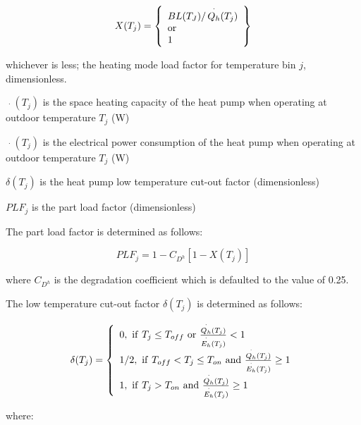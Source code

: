 \begin{equation}
X({T_j}) = \left\{ 
    \begin{array}{l}
      BL({T_J})/\mathop {{Q_h}}\limits^ \cdot  ({T_j}) \\
      {\rm{or}} \\
      1
    \end{array}
  \right\}
\end{equation}

whichever is less; the heating mode load factor for temperature bin \(j\), dimensionless.

\(\mathop {{Q_h}}\limits^ \cdot ({T_j})\) is the space heating capacity of the heat pump when operating at outdoor temperature \({T_j}\) (W)

\(\mathop {{E_h}}\limits^ \cdot ({T_j})\) is the electrical power consumption of the heat pump when operating at outdoor temperature \({T_j}\) (W)

\(\delta ({T_j})\) is the heat pump low temperature cut-out factor (dimensionless)

\(PL{F_j}\) is the part load factor (dimensionless)

The part load factor is determined as follows:

\begin{equation}
PL{F_j} = 1 - {C_{{D^h}}}[1 - X({T_j})]
\end{equation}

where \({C_{{D^h}}}\) is the degradation coefficient which is defaulted to the value of 0.25.

The low temperature cut-out factor \(\delta ({T_j})\) is determined as follows:

\begin{equation}
\delta ({T_j}) = \left\{ 
    \begin{array}{l}
      {\rm{0,~if~}}{T_j} \le {T_{off}}{\rm{~or~}}\frac{{\mathop {{Q_h}}\limits^ \cdot  ({T_j})}}{{\mathop {{E_h}}\limits^ \cdot  ({T_j})}} < 1 \\
      {\rm{1/2,~if~}}{T_{off}} < {T_j} \le {T_{on}}{\rm{~and~}}\frac{{\mathop {{Q_h}}\limits^ \cdot  ({T_j})}}{{\mathop {{E_h}}\limits^ \cdot  ({T_j})}} \ge 1 \\
      {\rm{1,~if~}}{T_j} > {T_{on}}{\rm{~and~}}\frac{{\mathop {{Q_h}}\limits^ \cdot  ({T_j})}}{{\mathop {{E_h}}\limits^ \cdot  ({T_j})}} \ge 1
    \end{array}
  \right.
\end{equation}

where:

